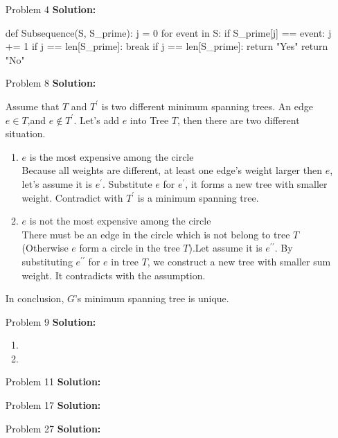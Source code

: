 \normalfont\documentclass[letterpaper,11pt]{article}
\begin{document}
\begin{enumerate}
\item [Problem 4]\textbf{Solution:}\par
\begin{python}
def Subsequence(S, S_prime):
	j = 0
	for event in S:
		if S_prime[j] == event:
			j += 1
		if j == len[S_prime]:
			break
	if j == len[S_prime]:
		return "Yes"
	return "No"
\end{python}
\item [Problem 8]\textbf{Solution:}\par
Assume that $T$ and $T^\prime$ is two different minimum spanning trees. An edge $e \in T$,and $e\not\in T^\prime$. Let's add $e$ into Tree $T$, then there are two different situation.
\begin{enumerate}
	\item$e$ is the most expensive among the circle\\
		Because all weights are different, at least one edge's weight larger then $e$, let's assume it is $e^\prime$. Substitute $e$ for $e^\prime$, it forms a new tree with smaller weight. Contradict with $T^\prime$ is a minimum spanning tree.
	\item$e$ is not the most expensive among the circle\\
		There must be an edge in the circle which is not belong to tree $T$(Otherwise $e$ form a circle in the tree $T$).Let assume it is $e^{\prime\prime}$. By substituting $e^{\prime\prime}$ for $e$ in tree $T$, we construct a new tree with smaller sum weight. It contradicts with the assumption.
\end{enumerate}
In conclusion, $G$'s minimum spanning tree is unique.
\item [Problem 9]\textbf{Solution:}\par
\begin{enumerate}
	\item
	\item
\end{enumerate}
\item [Problem 11]\textbf{Solution:}\par
\item [Problem 17]\textbf{Solution:}\par
\item [Problem 27]\textbf{Solution:}\par
\end{enumerate}
\end{document}
